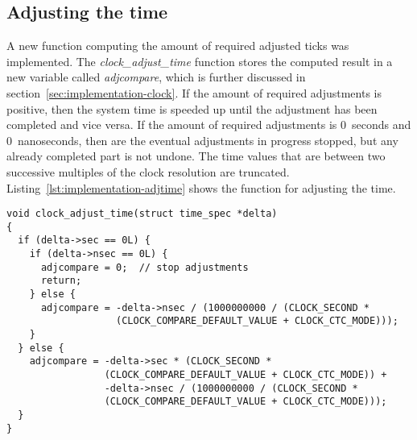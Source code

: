 \subsection{Adjusting the time}
A new function computing the amount of required adjusted ticks was implemented.
The {\it{clock\_adjust\_time}} function stores the computed result in
a new variable called {\it{adjcompare}}, which is further discussed in section~\ref{sec:implementation-clock}.
If the amount of required adjustments is positive, then the system time is speeded up until
the adjustment has been completed and vice versa.
If the amount of required adjustments is 0~seconds and 0~nanoseconds,
then are the eventual adjustments in progress stopped, but any already completed part is not undone.
The time values that are between two successive multiples of the clock resolution are truncated.
Listing~\ref{lst:implementation-adjtime} shows the function for adjusting the time.
\begin{lstlisting}[caption={Function for adjusting the time},label={lst:implementation-adjtime}]
void clock_adjust_time(struct time_spec *delta)
{
  if (delta->sec == 0L) {
    if (delta->nsec == 0L) {
      adjcompare = 0;  // stop adjustments
      return;
    } else {
      adjcompare = -delta->nsec / (1000000000 / (CLOCK_SECOND *
                   (CLOCK_COMPARE_DEFAULT_VALUE + CLOCK_CTC_MODE)));
    }
  } else {
    adjcompare = -delta->sec * (CLOCK_SECOND *
                 (CLOCK_COMPARE_DEFAULT_VALUE + CLOCK_CTC_MODE)) +
                 -delta->nsec / (1000000000 / (CLOCK_SECOND *
                 (CLOCK_COMPARE_DEFAULT_VALUE + CLOCK_CTC_MODE)));
  }
}
\end{lstlisting}

